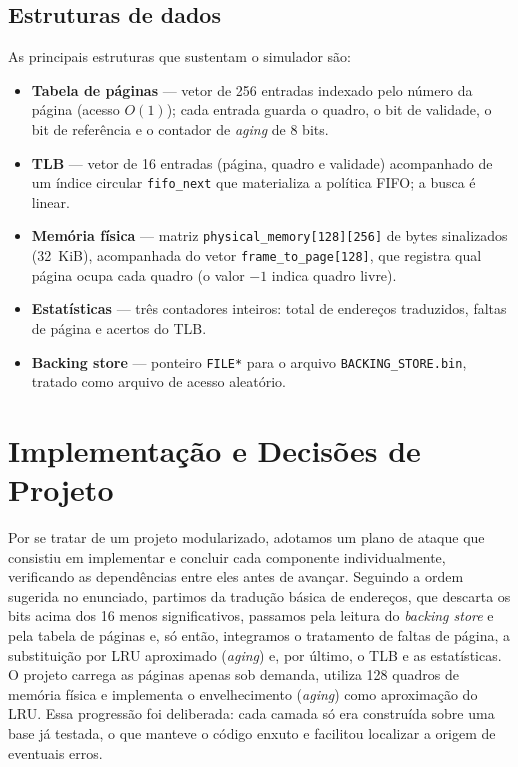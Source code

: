 \documentclass[11pt,a4paper]{article}
\begin{document}
\subsection{Estruturas de dados}
As principais estruturas que sustentam o simulador são:
\begin{itemize}
    \item \textbf{Tabela de páginas} --- vetor de 256 entradas indexado pelo
          número da página (acesso $O(1)$); cada entrada guarda o quadro, o bit
          de validade, o bit de referência e o contador de \textit{aging} de
          8 bits.
    \item \textbf{TLB} --- vetor de 16 entradas (página, quadro e validade)
          acompanhado de um índice circular \texttt{fifo\_next} que materializa a
          política FIFO; a busca é linear.
    \item \textbf{Memória física} --- matriz \texttt{physical\_memory[128][256]}
          de bytes sinalizados (32~KiB), acompanhada do vetor
          \texttt{frame\_to\_page[128]}, que registra qual página ocupa cada
          quadro (o valor $-1$ indica quadro livre).
    \item \textbf{Estatísticas} --- três contadores inteiros: total de endereços
          traduzidos, faltas de página e acertos do TLB.
    \item \textbf{Backing store} --- ponteiro \texttt{FILE*} para o arquivo
          \texttt{BACKING\_STORE.bin}, tratado como arquivo de acesso aleatório.
\end{itemize}

\section{Implementação e Decisões de Projeto}
\label{sec:implementacao}

Por se tratar de um projeto modularizado, adotamos um plano de ataque que
consistiu em implementar e concluir cada componente individualmente, verificando
as dependências entre eles antes de avançar. Seguindo a ordem sugerida no
enunciado, partimos da tradução básica de endereços, que descarta os bits
acima dos 16 menos significativos, passamos pela leitura do \textit{backing
store} e pela tabela de páginas e, só então, integramos o tratamento de faltas
de página, a substituição por LRU aproximado (\textit{aging}) e, por último, o
TLB e as estatísticas. O projeto carrega as páginas apenas sob demanda, utiliza
128 quadros de memória física e implementa o envelhecimento (\textit{aging})
como aproximação do LRU. Essa progressão foi deliberada: cada camada só era
construída sobre uma base já testada, o que manteve o código enxuto e facilitou
localizar a origem de eventuais erros.
\end{document}
